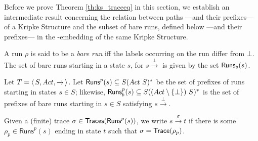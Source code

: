 \documentclass{llncs}
\newcommand{\ltstrans}[1]{\xrightarrow{#1}}
\begin{document}
Before we prove Theorem \ref{th:ks_traceeq} in this section, we establish
an intermediate result concerning the relation between paths ---and
their prefixes--- of a Kripke Structure and the subset of bare runs,
defined below ---and their prefixes--- in the \LTS-embedding of the same
Kripke Structure.


\begin{definition} A run $\rho$ is said
to be a \emph{bare run} iff the labels occurring on the run differ from
$\bot$. The set of bare runs starting in a state $s$, for $s \ltstrans{\bot}$
is given by the set $\mathsf{Runs_b}(s)$.
\end{definition}
\newcommand{\prefruns}[1]{\ensuremath{\mathsf{Runs}^p(#1)}}
\newcommand{\prefbareruns}[1]{\ensuremath{\mathsf{Runs}^p_b(#1)}}
\newcommand{\bare}[1]{\ensuremath{\beta(#1)}}

Let $T = \tuple{S, \act, \ltstrans{}}$.  Let $\prefruns{s} \subseteq S
(\act\ S)^*$ be the set of prefixes of runs starting in states $s \in S$;
likewise, $\prefbareruns{s} \subseteq S
((\act\setminus\{\bot\})\ S)^*$ is the set of prefixes of bare runs
starting in $s \in S$ satisfying $s \ltstrans{\bot}$.

Given a (finite) trace $\sigma \in \traces{\prefruns{s}}$, we write
$s \ltstrans{\sigma} t$ if there is some $\rho_p \in \prefruns{s}$
ending in state $t$ such that $\sigma = \mathsf{Trace}(\rho_p)$.
\end{document}
